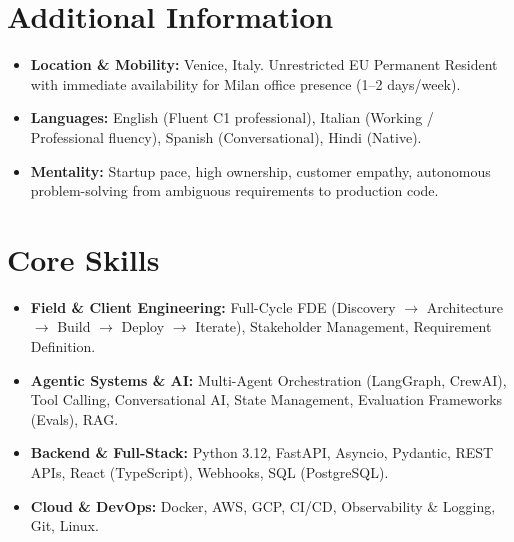 \documentclass[a4paper,10pt]{article}
\begin{document}
\section{Additional Information}
\begin{itemize}
  \item \textbf{Location \& Mobility:} Venice, Italy. Unrestricted EU Permanent Resident with immediate availability for Milan office presence (1--2 days/week).
  \item \textbf{Languages:} English (Fluent C1 professional), Italian (Working / Professional fluency), Spanish (Conversational), Hindi (Native).
  \item \textbf{Mentality:} Startup pace, high ownership, customer empathy, autonomous problem-solving from ambiguous requirements to production code.
\end{itemize}

\section{Core Skills}
\begin{itemize}
  \item \textbf{Field \& Client Engineering:} Full-Cycle FDE (Discovery $\rightarrow$ Architecture $\rightarrow$ Build $\rightarrow$ Deploy $\rightarrow$ Iterate), Stakeholder Management, Requirement Definition.
  \item \textbf{Agentic Systems \& AI:} Multi-Agent Orchestration (LangGraph, CrewAI), Tool Calling, Conversational AI, State Management, Evaluation Frameworks (Evals), RAG.
  \item \textbf{Backend \& Full-Stack:} Python 3.12, FastAPI, Asyncio, Pydantic, REST APIs, React (TypeScript), Webhooks, SQL (PostgreSQL).
  \item \textbf{Cloud \& DevOps:} Docker, AWS, GCP, CI/CD, Observability \& Logging, Git, Linux.
\end{itemize}
\end{document}

